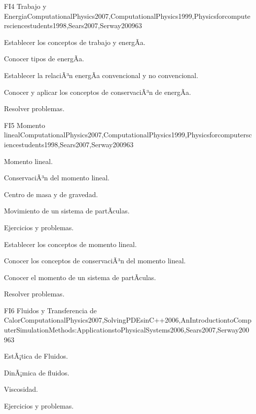 \begin{syllabus}
\begin{unit}{FI4 Trabajo y Energia}{ComputationalPhysics2007,ComputationalPhysics1999,Physicsforcomputersciencestudents1998,Sears2007,Serway2009}{6}{3}
   \begin{unitgoals}
      \item Establecer los conceptos de trabajo y energÃ­a.
      \item Conocer tipos de energÃ­a.
      \item Establecer la relaciÃ³n energÃ­a convencional y no convencional.
      \item Conocer y aplicar los conceptos de conservaciÃ³n de energÃ­a.
      \item Resolver problemas.
   \end{unitgoals}
\end{unit}

\begin{unit}{FI5 Momento lineal}{ComputationalPhysics2007,ComputationalPhysics1999,Physicsforcomputersciencestudents1998,Sears2007,Serway2009}{6}{3}
\begin{topics}
      \item Momento lineal.
      \item ConservaciÃ³n del momento lineal.
      \item Centro de masa y de gravedad.
      \item Movimiento de un sistema de partÃ­culas.
      \item Ejercicios y problemas.
  \end{topics}

   \begin{unitgoals}
      \item Establecer los conceptos de momento lineal.
      \item Conocer los conceptos de conservaciÃ³n del momento lineal.
      \item Conocer el momento de un sistema de partÃ­culas.
      \item Resolver problemas.
   \end{unitgoals}
\end{unit}

\begin{unit}{FI6 Fluidos y Transferencia de Calor}{ComputationalPhysics2007,SolvingPDEsinC++2006,AnIntroductiontoComputerSimulationMethods:ApplicationstoPhysicalSystems2006,Sears2007,Serway2009}{6}{3}
\begin{topics}
      \item EstÃ¡tica de Fluidos.
      \item DinÃ¡mica de fluidos. 
      \item Viscosidad.
      \item Ejercicios y problemas.
  \end{topics}


\end{unit}
\end{syllabus}
